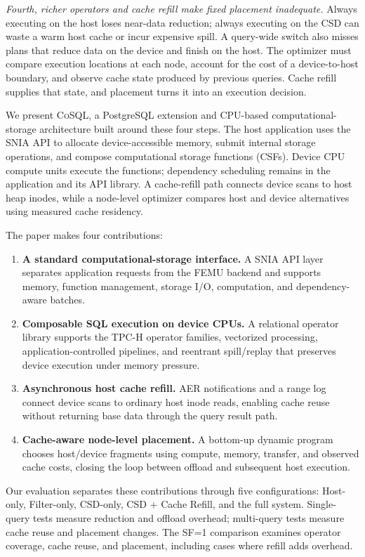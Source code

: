 \documentclass[sigconf, nonacm]{acmart}
\newcommand{\sys}{\textsc{CoSQL}}
\begin{document}
\emph{Fourth, richer operators and cache refill make fixed placement
inadequate.} Always executing on the host loses near-data reduction; always
executing on the CSD can waste a warm host cache or incur expensive spill.
A query-wide switch also misses plans that reduce data on the device and
finish on the host. The optimizer must compare execution locations at each
node, account for the cost of a device-to-host boundary, and observe cache
state produced by previous queries. Cache refill supplies that state, and
placement turns it into an execution decision.

We present \sys{}, a PostgreSQL extension and CPU-based computational-storage
architecture built around these four steps. The host application uses the
SNIA API to allocate device-accessible memory, submit internal storage
operations, and compose computational storage functions (CSFs). Device CPU
compute units execute the functions; dependency scheduling remains in the
application and its API library. A cache-refill path connects device scans
to host heap inodes, while a node-level optimizer compares host and device
alternatives using measured cache residency.

The paper makes four contributions:
\begin{enumerate}
\item \textbf{A standard computational-storage interface.} A SNIA API layer
separates application requests from the FEMU backend and supports memory,
function management, storage I/O, computation, and dependency-aware batches.
\item \textbf{Composable SQL execution on device CPUs.} A relational operator
library supports the TPC-H operator families, vectorized processing,
application-controlled pipelines, and reentrant spill/replay that preserves device execution under memory pressure.
\item \textbf{Asynchronous host cache refill.} AER notifications and a range
log connect device scans to ordinary host inode reads, enabling cache reuse
without returning base data through the query result path.
\item \textbf{Cache-aware node-level placement.} A bottom-up dynamic program
chooses host/device fragments using compute, memory, transfer, and observed
cache costs, closing the loop between offload and subsequent host execution.
\end{enumerate}

Our evaluation separates these contributions through five configurations:
Host-only, Filter-only, CSD-only, CSD + Cache Refill, and the full system.
Single-query tests measure reduction and offload overhead; multi-query tests
measure cache reuse and placement changes. The SF=1 comparison examines operator coverage, cache reuse, and placement,
including cases where refill adds overhead.
\end{document}
